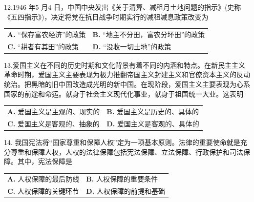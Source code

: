 \documentclass[UTF8,11pt]{ctexart}
\begin{document}
12.1946 年5 月4 日，中国中央发出《关于清算、减租月土地问题的指示》(史称《五四指示》)，决定将党在抗日战争时期实行的减租减息政策改变为


\begin{center}\begin{tabular}{>{\raggedright\arraybackslash}p{\dimexpr(\linewidth-4\tabcolsep)/2\relax}>{\raggedright\arraybackslash}p{\dimexpr(\linewidth-4\tabcolsep)/2\relax}}
\textbf{A.} “保存富农经济”的政策 & \textbf{B.} “地主不分田，富农分坏田”的政策\\[.35em]
\textbf{C.} “耕者有其田”的政策 & \textbf{D.} “没收一切土地”的政策\\[.35em]\end{tabular}\end{center}

13.爱国主义在不同的历史时期和文化背景有着不同的内涵和特点。在新民主主义革命时期，爱国主义主要表现为极力推翻帝国主义封建主义和官僚资本主义的反动统治。把黑暗的旧中国改造成光明的新中国。在现阶段，爱国主义主要表现为心系国家的前途和命运。献身于社会主义现代化事业，献身于祖国统一大业。这表明


\begin{center}\begin{tabular}{>{\raggedright\arraybackslash}p{\dimexpr(\linewidth-4\tabcolsep)/2\relax}>{\raggedright\arraybackslash}p{\dimexpr(\linewidth-4\tabcolsep)/2\relax}}
\textbf{A.} 爱国主义是主观的、现实的 & \textbf{B.} 爱国主义是历史的、具体的\\[.35em]
\textbf{C.} 爱国主义是客观的、抽象的 & \textbf{D.} 爱国主义是客观的、具体的\\[.35em]\end{tabular}\end{center}

14. 我国宪法将“国家尊重和保障人权”定为一项基本原则。法律的重要使命就是充分尊重和保障人权，人权的法律保障包括宪法保障、立法保障、行政保护和司法保障。其中，宪法保障是


\begin{center}\begin{tabular}{>{\raggedright\arraybackslash}p{\dimexpr(\linewidth-4\tabcolsep)/2\relax}>{\raggedright\arraybackslash}p{\dimexpr(\linewidth-4\tabcolsep)/2\relax}}
\textbf{A.} 人权保障的最后防线 & \textbf{B.} 人权保障的重要条件\\[.35em]
\textbf{C.} 人权保障的关键环节 & \textbf{D.} 人权保障的前提和基础\\[.35em]\end{tabular}\end{center}
\end{document}
